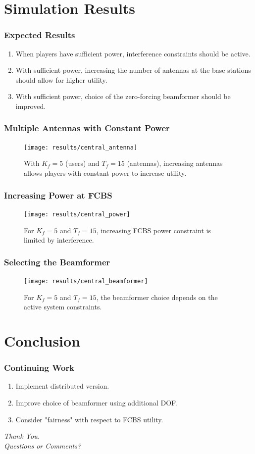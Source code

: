 \documentclass[10pt,tgadventor, onlymath]{beamer}
\begin{document}
\section{Simulation Results}

\begin{frame}
\frametitle{Expected Results}
\begin{enumerate}
\setlength\itemsep{2em}

\item
	When players have sufficient power, interference constraints should be active.
\item
	With sufficient power, increasing the number of antennas at the base stations should allow for higher utility.
\item
	With sufficient power, choice of the zero-forcing beamformer should be improved. 
\end{enumerate}
\end{frame}


\begin{frame}
\frametitle{Multiple Antennas with Constant Power}
\begin{figure}
	\texttt{[image: results/central\_antenna]}
	\caption{With $K_f = 5$ (users) and $T_f = 15$ (antennas), increasing antennas allows players with constant power to increase utility.}
\end{figure}
\end{frame}

\begin{frame}
\frametitle{Increasing Power at FCBS}
\begin{figure}
	\texttt{[image: results/central\_power]}
	\caption{For $K_f = 5$ and $T_f = 15$, increasing FCBS power constraint is limited by interference.}
\end{figure}
\end{frame}

\begin{frame}
\frametitle{Selecting the Beamformer}
\begin{figure}
	\texttt{[image: results/central\_beamformer]}
\caption{For $K_f = 5$ and $T_f = 15$, the beamformer choice depends on the active system constraints.}
\end{figure}
\end{frame}

\section{Conclusion}
\begin{frame}
\frametitle{Continuing Work}
\begin{enumerate}
\item
	Implement distributed version.
\item
	Improve choice of beamformer using additional DOF. 
\item
	Consider "fairness" with respect to FCBS utility.
\end{enumerate}
\end{frame}

\begin{frame}
  \centering \Large
  \emph{Thank You.}
  \\
	\bigskip
    \centering \Large
  \emph{Questions or Comments?}
\end{frame}
\end{document}
